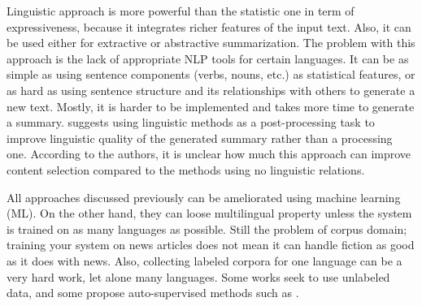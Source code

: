Linguistic approach is more powerful than the statistic one in term of expressiveness, because it integrates richer features of the input text. 
Also, it can be used either for extractive or abstractive summarization.  
The problem with this approach is the lack of appropriate NLP tools for certain languages. 
It can be as simple as using sentence components (verbs, nouns, etc.) as statistical features, or as hard as using sentence structure and its relationships with others to generate a new text. 
Mostly, it is harder to be implemented and takes more time to generate a summary. 
\citet{11-nenkova-mckeown} suggests using linguistic methods as a post-processing task to improve linguistic quality of the generated summary rather than a processing one.
According to the authors, it is unclear how much this approach can improve content selection compared to the methods using no linguistic relations. 

All approaches discussed previously can be ameliorated using machine learning (ML).
On the other hand, they can loose multilingual property unless the system is trained on as many languages as possible. 
Still the problem of corpus domain; training your system on news articles does not mean it can handle fiction as good as it does with news.
Also, collecting labeled corpora for one language can be a very hard work, let alone many languages. 
Some works seek to use unlabeled data, and some propose auto-supervised methods such as \citep{02-amini-gallinari}.


